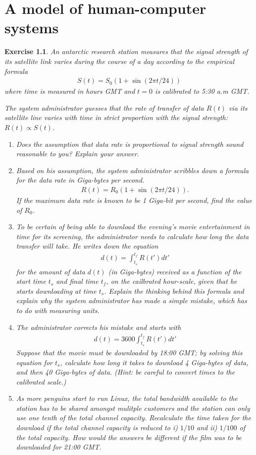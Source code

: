 \documentclass{book}
\newtheorem{exercise}{Exercise}
\def\beq{\begin{eqnarray}}
\def\eeq{\end{eqnarray}}
\begin{document}
\begin{solution}
\end{solution}





\chapter{ A model of human-computer systems}

\begin{exercise} 
An antarctic research station measures that the signal strength of
its satellite link varies during the course of a day according
to the empirical formula
\beq
S(t) = S_0(1+\sin(2\pi t/24))
\eeq
where time is measured in hours GMT and $t=0$ is calibrated to 5:30 a.m GMT.

The system administrator guesses that the rate of transfer of data 
$R(t)$ via its satellite line varies with time in strict proportion
with the signal strength: $R(t) \propto S(t)$.
\begin{enumerate}
\item Does the assumption that data rate is proportional to signal strength
sound reasonable to you? Explain your answer.

\item Based on his assumption, the system administrator scribbles down
a formula for the data rate in {\em Giga-bytes per second}.
\beq
R(t) = R_0 (1+\sin(2\pi t/24)).
\eeq
If the maximum data rate is known to be 1 Giga-bit per second,
find the value of $R_0$.

\item To be certain of being able to download the evening's movie entertainment
in time for its screening, the administrator needs to calculate how
long the data transfer will take. He writes down the equation
\beq
d(t) = \int_{t_s}^{t_f} R(t')dt'
\eeq
for the amount of data $d(t)$ (in Giga-bytes) received as a function of the start time
$t_s$ and final time $t_f$, on the cailbrated hour-scale, given that
he starts downloading at time $t_s$. Explain the thinking behind this
formula and explain why the system administrator has made a simple
mistake, which has to do with measuring units.

\item The administrator corrects his mistake and starts with
\beq
d(t) = 3600 \int_{t_s}^{t_f} R(t')dt'
\eeq
Suppose that the movie must be downloaded by 18:00 GMT; by solving
this equation for $t_s$, calculate how long it takes to download 4
Giga-bytes of data, and then 40 Giga-bytes of data. (Hint: be careful
to convert times to the calibrated scale.)

\item As more penguins start to run Linux, the total bandwidth available
to the station has to be shared amongst mulitple customers and the
station can only use one tenth of the total channel capacity. Recalculate
the time taken for the download if the total channel capacity is reduced to
i) $1/10$ and ii) $1/100$ of the total capacity. How would the answers
be different if the film was to be downloaded for 21:00 GMT.

\end{enumerate}
\end{exercise}
\end{document}
